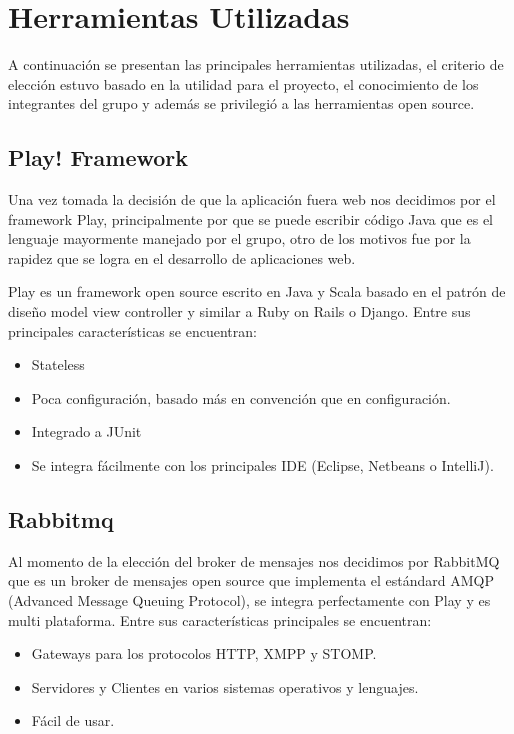 \section{Herramientas Utilizadas}

A continuación se presentan las principales herramientas utilizadas, el criterio de elección estuvo basado en la utilidad para el proyecto, el conocimiento de los integrantes del grupo y además se privilegió a las herramientas open source.

\subsection{Play! Framework}

Una vez tomada la decisión de que la aplicación fuera web nos decidimos por el framework Play, principalmente por que se puede
escribir código Java que es el lenguaje mayormente manejado por el grupo, otro de los motivos fue por la rapidez que se logra en el desarrollo de aplicaciones web.

Play es un framework open source escrito en Java y Scala basado en el patrón de diseño model view controller y similar a Ruby on Rails o Django. Entre sus principales características se encuentran:

\begin{itemize}
\item Stateless
\item Poca configuración, basado más en convención que en configuración.
\item Integrado a JUnit	
\item Se integra fácilmente con los principales IDE (Eclipse, Netbeans o IntelliJ).
\end{itemize}

\subsection{Rabbitmq}

Al momento de la elección del broker de mensajes nos decidimos por RabbitMQ que es un broker de mensajes open source que implementa el estándard AMQP (Advanced Message Queuing Protocol), se integra perfectamente con Play y es multi plataforma. 
Entre sus características principales se encuentran:

\begin{itemize}
\item Gateways para los protocolos HTTP, XMPP y STOMP.
\item Servidores y Clientes en varios sistemas operativos y lenguajes.
\item Fácil de usar.
\end{itemize}
 
